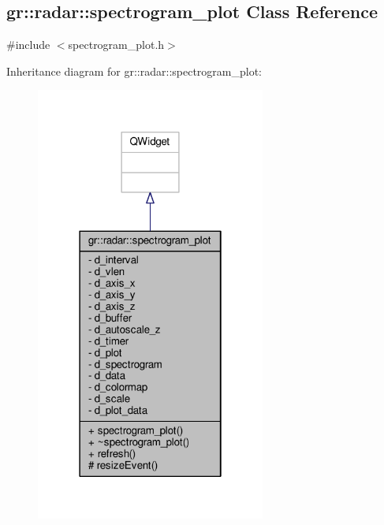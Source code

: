 \subsection{gr\+:\+:radar\+:\+:spectrogram\+\_\+plot Class Reference}
\label{classgr_1_1radar_1_1spectrogram__plot}


{\ttfamily \#include $<$spectrogram\+\_\+plot.\+h$>$}



Inheritance diagram for gr\+:\+:radar\+:\+:spectrogram\+\_\+plot\+:
\nopagebreak
\begin{figure}[H]
\begin{center}
\leavevmode
\includegraphics[width=214pt]{dd/d28/classgr_1_1radar_1_1spectrogram__plot__inherit__graph}
\end{center}
\end{figure}


